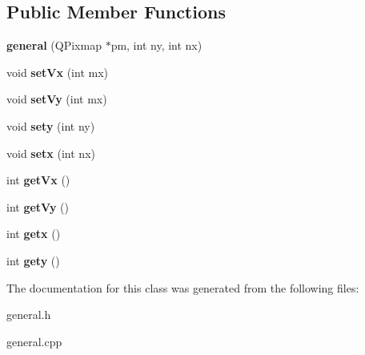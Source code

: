 \subsection*{\-Public \-Member \-Functions}
\begin{DoxyCompactItemize}
\item 
\hypertarget{classgeneral_a70ceaee532e7e8815bd0c93a3644a24f}{{\bfseries general} (\-Q\-Pixmap $\ast$pm, int ny, int nx)}\label{classgeneral_a70ceaee532e7e8815bd0c93a3644a24f}

\item 
\hypertarget{classgeneral_a985814c4fbbe0f63881ca77a6b9fe7ae}{void {\bfseries set\-Vx} (int mx)}\label{classgeneral_a985814c4fbbe0f63881ca77a6b9fe7ae}

\item 
\hypertarget{classgeneral_ae7b2af937f63162adf022baba4d036bd}{void {\bfseries set\-Vy} (int mx)}\label{classgeneral_ae7b2af937f63162adf022baba4d036bd}

\item 
\hypertarget{classgeneral_a2014439b24c33c186f049e2bf9a27dce}{void {\bfseries sety} (int ny)}\label{classgeneral_a2014439b24c33c186f049e2bf9a27dce}

\item 
\hypertarget{classgeneral_a762f28b6b43d7cc0d35ba3e899a51d53}{void {\bfseries setx} (int nx)}\label{classgeneral_a762f28b6b43d7cc0d35ba3e899a51d53}

\item 
\hypertarget{classgeneral_a09533f862df0cfc41f7a0bb841f0bfe7}{int {\bfseries get\-Vx} ()}\label{classgeneral_a09533f862df0cfc41f7a0bb841f0bfe7}

\item 
\hypertarget{classgeneral_a224beb0725ad5406203357bb128e76b2}{int {\bfseries get\-Vy} ()}\label{classgeneral_a224beb0725ad5406203357bb128e76b2}

\item 
\hypertarget{classgeneral_a28c36909fac13d5cd2c6876009d12c3f}{int {\bfseries getx} ()}\label{classgeneral_a28c36909fac13d5cd2c6876009d12c3f}

\item 
\hypertarget{classgeneral_abc8d35c507d0a712e206f55b01f9907e}{int {\bfseries gety} ()}\label{classgeneral_abc8d35c507d0a712e206f55b01f9907e}

\end{DoxyCompactItemize}


\-The documentation for this class was generated from the following files\-:\begin{DoxyCompactItemize}
\item 
general.\-h\item 
general.\-cpp\end{DoxyCompactItemize}
